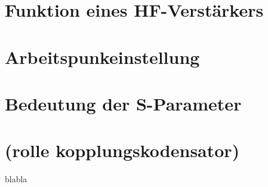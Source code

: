 \section{Funktion eines HF-Verstärkers}
\section{Arbeitspunkeinstellung}
\section{Bedeutung der S-Parameter}
\section{(rolle kopplungskodensator)}
blabla 
\clearpage